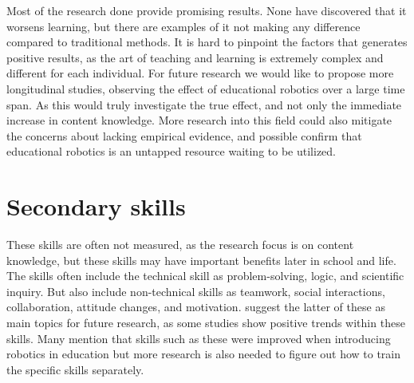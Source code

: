 \bigskip\noindent
Most of the research done provide promising results. None have discovered that it worsens learning, but there are examples of it not making any difference compared to traditional methods. It is hard to pinpoint the factors that generates positive results, as the art of teaching and learning is extremely complex and different for each individual. 
For future research we would like to propose more longitudinal studies, observing the effect of educational robotics over a large time span. 
As this would truly investigate the true effect, and not only the immediate increase in content knowledge. 
More research into this field could also mitigate the concerns about lacking empirical evidence, and possible confirm that educational robotics is
an untapped resource waiting to be utilized. 

\section{Secondary skills}
These skills are often not measured, as the research focus is on content knowledge, but these skills may have important benefits later in school and life.
The skills often include the technical skill as problem-solving, logic, and scientific inquiry. But also include non-technical skills as teamwork, social interactions, collaboration, attitude changes, and motivation.
\citeauthor{Benitti2012978} suggest the latter of these as main topics for future research, as some studies show positive trends within these skills. 
Many mention that skills such as these were improved when introducing robotics in education but more research is also needed to figure out how to train the specific skills separately. 

